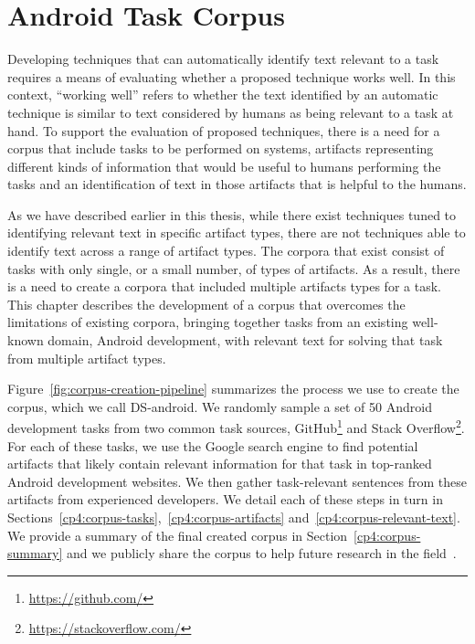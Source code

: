 \setcounter{chapter}{3}


\chapter{Android Task Corpus}
\label{ch:android-corpus}



Developing techniques that can automatically identify text
relevant to a task requires a means of evaluating whether
a proposed technique works well. In this context,
``working well'' refers to whether the text identified
by an automatic technique is similar to text considered
by humans as being relevant to a task at hand. To support
the evaluation of proposed techniques, there is a 
need for
a corpus that include tasks to be performed on
systems, artifacts representing different kinds of information
that would be useful to humans performing the tasks
and an identification of text in those artifacts that
is helpful to the humans.

As we have described earlier in this thesis, while there
exist techniques tuned to identifying relevant text in
specific artifact types, there are not techniques able to
identify text across a range of artifact types. The corpora that exist consist of tasks with only single,
or a small number, of types of artifacts. As a result,
there is a need to create a corpora that included
multiple artifacts types for a task. This chapter describes the
development of a corpus that overcomes the limitations of
existing corpora, bringing together tasks from an existing
well-known domain, Android development, with relevant text
for solving that task from multiple artifact types.


Figure~\ref{fig:corpus-creation-pipeline}
summarizes the process we use to create the corpus, which we call \acs{DS-android}.
We randomly sample a set of 50 Android development tasks from two common
task sources, GitHub\footnote{\url{https://github.com/}} and Stack Overflow\footnote{\url{https://stackoverflow.com/}}.
For each of these tasks, we use the Google search engine to find potential artifacts that likely contain relevant
information for that task in top-ranked Android development websites. 
We then gather task-relevant sentences from these artifacts
from experienced developers.
We detail each of these steps in turn in 
Sections~\ref{cp4:corpus-tasks},~\ref{cp4:corpus-artifacts} and~\ref{cp4:corpus-relevant-text}.
We provide a summary of the final created corpus in Section~\ref{cp4:corpus-summary} 
and we publicly share the corpus to help future research in the field~\cite{dsandroid}.


